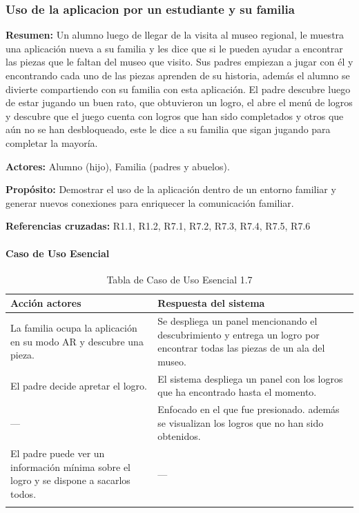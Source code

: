 \subsubsection{Uso de la aplicacion por un estudiante y su familia}

{\textbf {Resumen:}}
Un alumno luego de llegar de la visita al museo regional, le muestra una aplicación nueva a su familia y les dice que si le pueden ayudar a encontrar las piezas que le faltan del museo que visito. Sus padres empiezan a jugar con él y encontrando cada uno de las piezas aprenden de su historia, además el alumno se divierte compartiendo con su familia con esta aplicación. El padre descubre luego de estar jugando un buen rato, que obtuvieron un logro, el abre el menú de logros y descubre que el juego cuenta con logros que han sido completados y otros que aún no se han desbloqueado, este le dice a su familia que sigan jugando para completar la mayoría.

{\textbf {Actores:}}
Alumno (hijo), Familia (padres y abuelos).

{\textbf {Propósito:}}
Demostrar el uso de la aplicación dentro de un entorno familiar y generar nuevos conexiones para enriquecer la comunicación familiar.

{\textbf {Referencias cruzadas:}}
R1.1, R1.2, R7.1, R7.2, R7.3, R7.4, R7.5, R7.6

\paragraph{Caso de Uso Esencial}

\begin{longtable}{|p{5cm}|p{8cm}|}
\hline 
Acción actores & Respuesta del sistema \\ 
\hline 
La familia ocupa la aplicación en su modo AR y descubre una pieza. & Se despliega un panel mencionando el descubrimiento y entrega un logro por encontrar todas las piezas de un ala del museo. \\ 
\hline 
El padre decide apretar el logro. & El sistema despliega un panel con los logros que ha encontrado hasta el momento. \\ 
\hline
--- & Enfocado en el que fue presionado. además se visualizan los logros que no han sido obtenidos. \\ 
\hline
El padre puede ver un información mínima sobre el logro y se dispone a sacarlos todos. & --- \\ 
\hline
\caption{Tabla de Caso de Uso Esencial 1.7}
\label{tab27}
\end{longtable}

